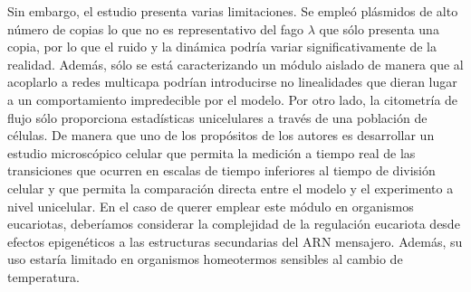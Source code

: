 \documentclass[nochap]{config/ejercicios}
\begin{document}



Sin embargo, el estudio presenta varias limitaciones. Se empleó plásmidos de alto número de copias lo que no es representativo del fago $\lambda$ que sólo presenta una copia, por lo que el ruido y la dinámica podría variar significativamente de la realidad. Además, sólo se está caracterizando un módulo aislado de manera que al acoplarlo a redes multicapa podrían introducirse no linealidades que dieran lugar a un comportamiento impredecible por el modelo. Por otro lado, la citometría de flujo sólo proporciona estadísticas unicelulares a través de una población de células. De manera que uno de los propósitos de los autores es desarrollar un estudio microscópico celular que permita la medición a tiempo real de las transiciones que ocurren en escalas de tiempo inferiores al tiempo de división celular y que permita la comparación directa entre el modelo y el experimento a nivel unicelular. En el caso de querer emplear este módulo en organismos eucariotas, deberíamos considerar la complejidad de la regulación eucariota desde efectos epigenéticos a las estructuras secundarias del ARN mensajero. Además, su uso estaría limitado en organismos homeotermos sensibles al cambio de temperatura.
\end{document}
